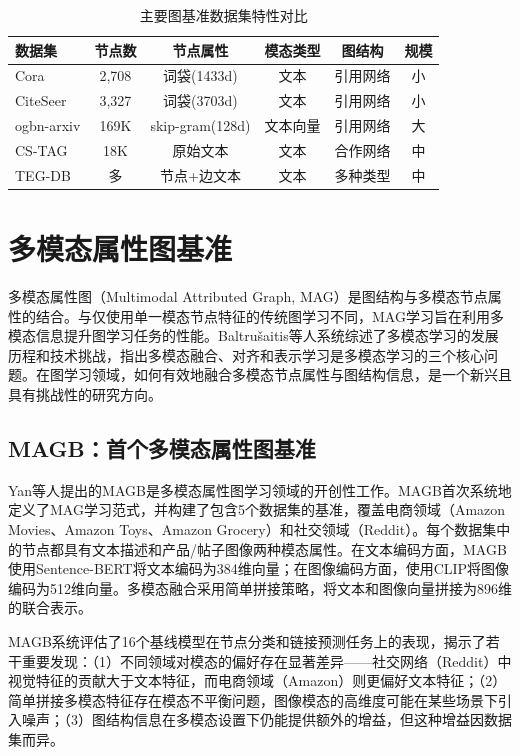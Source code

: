 \begin{table}[htbp]
  \centering
  \caption{主要图基准数据集特性对比}
  \label{tab:graph_benchmarks}
  \begin{tabular}{lccccc}
    \toprule
    数据集 & 节点数 & 节点属性 & 模态类型 & 图结构 & 规模 \\
    \midrule
    Cora\cite{sen2008collective} & 2,708 & 词袋(1433d) & 文本 & 引用网络 & 小 \\
    CiteSeer\cite{sen2008collective} & 3,327 & 词袋(3703d) & 文本 & 引用网络 & 小 \\
    ogbn-arxiv\cite{hu2020ogb} & 169K & skip-gram(128d) & 文本向量 & 引用网络 & 大 \\
    CS-TAG\cite{yan2023cstag} & 18K & 原始文本 & 文本 & 合作网络 & 中 \\
    TEG-DB\cite{li2024tegdb} & 多 & 节点+边文本 & 文本 & 多种类型 & 中 \\
    \bottomrule
  \end{tabular}
\end{table}

\section{多模态属性图基准}

多模态属性图（Multimodal Attributed Graph, MAG）是图结构与多模态节点属性的结合。与仅使用单一模态节点特征的传统图学习不同，MAG学习旨在利用多模态信息提升图学习任务的性能。Baltru\v{s}aitis等人\cite{baltruvsaitis2019multimodal}系统综述了多模态学习的发展历程和技术挑战，指出多模态融合、对齐和表示学习是多模态学习的三个核心问题。在图学习领域，如何有效地融合多模态节点属性与图结构信息，是一个新兴且具有挑战性的研究方向。

\subsection{MAGB：首个多模态属性图基准}

Yan等人\cite{yan2025magb}提出的MAGB是多模态属性图学习领域的开创性工作。MAGB首次系统地定义了MAG学习范式，并构建了包含5个数据集的基准，覆盖电商领域（Amazon Movies、Amazon Toys、Amazon Grocery）和社交领域（Reddit）。每个数据集中的节点都具有文本描述和产品/帖子图像两种模态属性。在文本编码方面，MAGB使用Sentence-BERT\cite{reimers2019sbert}将文本编码为384维向量；在图像编码方面，使用CLIP\cite{radford2021clip}将图像编码为512维向量。多模态融合采用简单拼接策略，将文本和图像向量拼接为896维的联合表示。

MAGB系统评估了16个基线模型在节点分类和链接预测任务上的表现，揭示了若干重要发现：（1）不同领域对模态的偏好存在显著差异——社交网络（Reddit）中视觉特征的贡献大于文本特征，而电商领域（Amazon）则更偏好文本特征；（2）简单拼接多模态特征存在模态不平衡问题，图像模态的高维度可能在某些场景下引入噪声；（3）图结构信息在多模态设置下仍能提供额外的增益，但这种增益因数据集而异。

